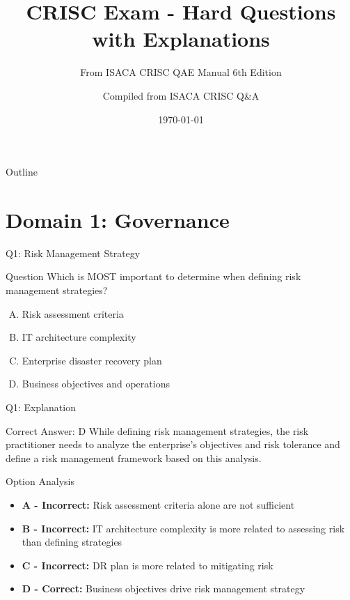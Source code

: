 \documentclass{beamer}
\title{CRISC Exam - Hard Questions with Explanations}
\subtitle{From ISACA CRISC QAE Manual 6th Edition}
\author{Compiled from ISACA CRISC Q\&A}
\date{\today}
\begin{document}
	
	\begin{frame}
		\titlepage
	\end{frame}
	
	\begin{frame}{Outline}
		\tableofcontents
	\end{frame}
	
	
	\section{Domain 1: Governance}
	
	\begin{frame}{Q1: Risk Management Strategy}
		\begin{block}{Question}
			Which is MOST important to determine when defining risk management strategies?
		\end{block}
		\begin{enumerate}[(A)]
			\item Risk assessment criteria
			\item IT architecture complexity
			\item Enterprise disaster recovery plan
			\item Business objectives and operations
		\end{enumerate}
	\end{frame}
	
	\begin{frame}{Q1: Explanation}
		\begin{block}{Correct Answer: D}
			While defining risk management strategies, the risk practitioner needs to analyze the enterprise's objectives and risk tolerance and define a risk management framework based on this analysis.
		\end{block}
		\begin{block}{Option Analysis}
			\begin{itemize}
				\item \textbf{A - Incorrect:} Risk assessment criteria alone are not sufficient
				\item \textbf{B - Incorrect:} IT architecture complexity is more related to assessing risk than defining strategies
				\item \textbf{C - Incorrect:} DR plan is more related to mitigating risk
				\item \textbf{D - Correct:} Business objectives drive risk management strategy
			\end{itemize}
		\end{block}
	\end{frame}
	
\end{document}

